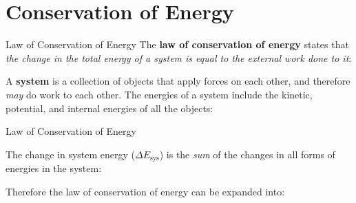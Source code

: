 \documentclass[12pt,compress,aspectratio=169]{beamer}
\begin{document}
%    
%
%


\section{Conservation of Energy}

\begin{frame}{Law of Conservation of Energy}
  The \textbf{law of conservation of energy} states that \emph{the change in
  the total energy of a system is equal to the external work done to it}:


  A \textbf{system} is a collection of objects that apply forces on each other,
  and therefore \emph{may} do work to each other. The energies of a system
  include the kinetic, potential, and internal energies of all the objects:

\end{frame}



\begin{frame}{Law of Conservation of Energy}

  The change in system energy ($\Delta E_\text{sys}$) is the \emph{sum} of the
  changes in all forms of energies in the system:
  

  Therefore the law of conservation of energy can be expanded into:

\end{frame}
\end{document}
